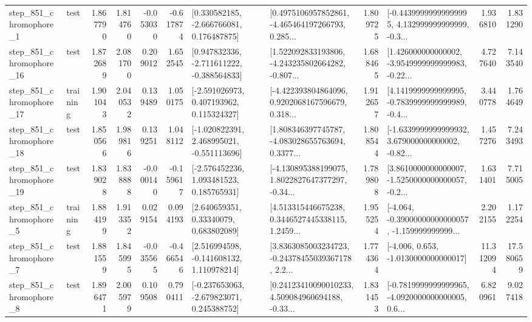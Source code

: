 \begin{tabular}{llrrrrllrlrr}
   step\_851\_chromophore\_1 &      test &      1.867790 &    1.814760 &     -0.053030 & -0.617874 &    [0.330582185, -2.666766081, 0.176487875] &  [0.4975106957852861, -4.465464197266793, 0.285... &       1.809725 &  [-0.44399999999999995, 4.132999999999999, -0.3... &            1.936810 &          1.831290 \\
  step\_851\_chromophore\_16 &      test &      1.872689 &    2.081700 &      0.209012 &  1.652545 &   [0.947832336, -2.711611222, -0.388564833] &  [1.522092833193806, -4.243235802664282, -0.807... &       1.688465 &  [1.426000000000002, -3.9549999999999983, -0.22... &            4.727640 &          7.143540 \\
  step\_851\_chromophore\_17 &  training &      1.901043 &    2.040532 &      0.139489 &  1.050175 &    [-2.591026973, 0.407193962, 0.115324327] &  [-4.422393804864096, 0.9202068167596679, 0.318... &       1.912657 &  [4.1419999999999995, -0.7839999999999989, -0.4... &            3.440778 &          1.764649 \\
  step\_851\_chromophore\_18 &      test &      1.850566 &    1.989816 &      0.139251 &  1.048112 &   [-1.020822391, 2.468995021, -0.551113696] &  [1.808346397745787, -4.083028655763694, 0.3377... &       1.808544 &  [-1.6339999999999932, 3.679000000000002, -0.82... &            1.457276 &          7.243493 \\
  step\_851\_chromophore\_19 &      test &      1.839028 &    1.838888 &     -0.000140 & -0.159617 &    [-2.576452236, 1.093481523, 0.185765931] &  [-4.130895388199075, 1.8022827647377297, -0.34... &       1.789808 &  [3.8610000000000007, -1.5250000000000057, -0.2... &            1.631401 &          7.715005 \\
   step\_851\_chromophore\_5 &  training &      1.884199 &    1.913352 &      0.029154 &  0.094193 &      [2.640659351, 0.33340079, 0.683802089] &  [4.513315446675238, 0.3446527445338115, 1.2459... &       1.955254 &  [-4.064, -0.39000000000000057, -1.159999999999... &            2.202155 &          1.172254 \\
   step\_851\_chromophore\_7 &      test &      1.881559 &    1.845995 &     -0.035565 & -0.466546 &    [2.516994598, -0.141608132, 1.110978214] &  [3.8363085003234723, -0.24378455039367178, 2.2... &       1.774364 &               [-4.006, 0.653, -1.0130000000000017] &           11.312094 &         17.580659 \\
   step\_851\_chromophore\_8 &      test &      1.896471 &    2.005979 &      0.109508 &  0.790411 &   [-0.237653063, -2.679823071, 0.245388752] &  [0.24123410090010233, 4.509084960694188, -0.33... &       1.831453 &  [-0.7819999999999965, -4.0920000000000005, 0.6... &            6.820961 &          9.027418 \\

\end{tabular}
